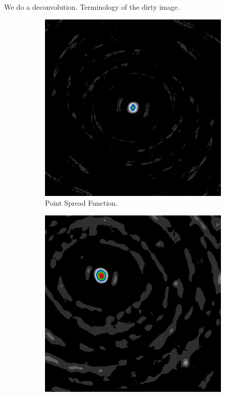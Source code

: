 We do a deconvolution.
Terminology of the dirty image.
\begin{figure}[h]
	\centering
	\begin{subfigure}[b]{0.3\linewidth}
		\includegraphics[width=\linewidth]{./chapters/01.intro/mk2/psf.png}
		\caption{Point Spread Function.}
		\label{results:points:tclean}
	\end{subfigure}
	\begin{subfigure}[b]{0.3\linewidth}
		\includegraphics[width=\linewidth]{./chapters/01.intro/mk2/dirty.png}

\end{subfigure}
\end{figure}
